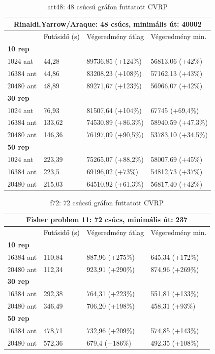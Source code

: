 \begin{table}[ht!]
	\centering
	\begin{tabular}{|p{2cm}||p{3cm}|p{3.5cm}|p{3.5cm}|}
		\hline
		\multicolumn{4}{|c|}{Rinaldi,Yarrow/Araque: 48 csúcs, minimális út: 40002} \\
		\hline
		& Futásidő (s) & Végeredmény átlag & Végeredmény min.\\
		\hline
		\textbf{10 rep} & & & \\
		1024 ant & 44,28 & 89736,85 (+124\%) & 56813,06 (+42\%) \\
		16384 ant & 44,86 & 83208,23 (+108\%) & 57162,13 (+43\%) \\
		20480 ant & 48,89 & 89271,67 (+123\%) & 56966,07 (+42\%) \\
		\hline
		\textbf{30 rep} & & & \\
		1024 ant & 76,93 & 81507,64 (+104\%) & 67745 (+69,4\%) \\
		16384 ant & 133,62 & 74530,89 (+86,3\%) & 58940,59 (+47,3\%) \\
		20480 ant & 146,36 & 76197,09 (+90,5\%) & 53783,10 (+34,5\%) \\
		\hline
		\textbf{50 rep} & & & \\
		1024 ant & 223,39 & 75265,07 (+88,2\%) & 58007,69 (+45\%) \\
		16384 ant & 223,5 & 69196,02 (+73\%) & 54812,73 (+37\%) \\
		20480 ant & 215,03 & 64510,92 (+61,3\%) & 56817,40 (+42\%) \\
		\hline
	\end{tabular}
	\caption{att48: 48 csúcsú gráfon futtatott CVRP}
	\label{table:CVRP_att48}
\end{table}

\begin{table}[ht!]
	\centering
	\begin{tabular}{|p{2cm}||p{3cm}|p{3.5cm}|p{3.5cm}|}
		\hline
		\multicolumn{4}{|c|}{Fisher problem 11: 72 csúcs, minimális út: 237} \\
		\hline
		& Futásidő (s) & Végeredmény átlag & Végeredmény min.\\
		\hline
		\textbf{10 rep} & & & \\
		16384 ant & 110,84 & 887,96 (+275\%) & 645,34 (+172\%)\\
		20480 ant & 112,34 & 923,91 (+290\%) & 874,96 (+269\%)\\
		\hline
		\textbf{30 rep} & & & \\
		16384 ant & 292,38 & 764,31 (+223\%) & 551,81 (+133\%) \\
		20480 ant & 346,49 & 706,20 (+198\%) & 458,31 (+93\%) \\
		\hline
		\textbf{50 rep} & & & \\
		16384 ant & 478,71 & 732,96 (+209\%) & 574,85 (+143\%)\\
		20480 ant & 572,36 & 679,4 (+186\%) & 492,35 (+108\%)\\
		\hline
	\end{tabular}
	\caption{f72: 72 csúcsú gráfon futtatott CVRP}
	\label{table:CVRP_f72}
\end{table}

